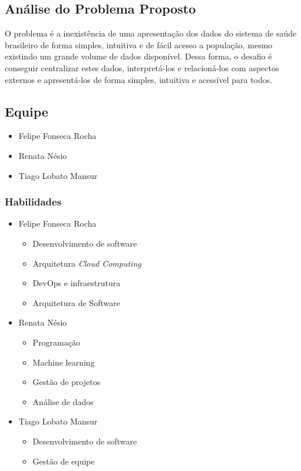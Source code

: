\documentclass[journal]{IEEEtran}
\begin{document}
\subsection{Análise do Problema Proposto}
O problema é a inexistência de uma apresentação dos dados do sistema de saúde brasileiro de forma simples, intuitiva e de fácil acesso a população, mesmo existindo um grande volume de dados disponível. Dessa forma, o desafio é conseguir centralizar estes dados, interpretá-los e relacioná-los com aspectos externos e apresentá-los de forma simples, intuitiva e acessível para todos. 
\subsection{Equipe}
\begin{itemize}
    \item Felipe Fonseca Rocha
    \item Renata Nésio
    \item Tiago Lobato Mansur
\end{itemize}

\subsubsection{Habilidades}
\begin{itemize}
   \item Felipe Fonseca Rocha
   \begin{itemize}
     \item Desenvolvimento de software
     \item Arquitetura \textit{Cloud Computing}
     \item DevOps e infraestrutura
     \item Arquitetura de Software
   \end{itemize}

    \item Renata Nésio
   \begin{itemize}
     \item Programação
     \item Machine learning 
     \item Gestão de projetos
     \item Análise de dados
   \end{itemize}

   \item Tiago Lobato Mansur
   \begin{itemize}
     \item Desenvolvimento de software
     \item Gestão de equipe
   \end{itemize}

\end{itemize}
\end{document}
